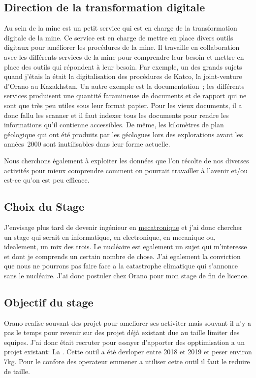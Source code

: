 \subsection{Direction de la transformation digitale}
Au sein de la mine est un petit service qui est en charge de la transformation digitale de la mine. Ce service est en charge de mettre en place divers outils digitaux pour améliorer les procédures de la mine. Il travaille en collaboration avec les différents services de la mine pour comprendre leur besoin et mettre en place des outils qui répondent à leur besoin. Par exemple, un des grands sujets quand j'étais la était la digitalisation des procédures de Katco, la joint-venture d'Orano au Kazakhstan. Un autre exemple est la documentation~; les différents services produisent une quantité faramineuse de documents et de rapport qui ne sont que très peu utiles sous leur format papier. Pour les vieux documents, il a donc fallu les scanner et il faut indexer tous les documents pour rendre les informations qu'il contienne accessibles. De même, les kilomètres de plan géologique qui ont été produits par les géologues lors des explorations avant les années~2000 sont inutilisables dans leur forme actuelle.

Nous cherchons également à exploiter les données que l'on récolte de nos diverses activités pour mieux comprendre comment on pourrait travailler à l'avenir et/ou est-ce qu’on est peu efficace.

\subsection{Choix du Stage}
J'envisage plus tard de devenir ingénieur en \href{https://fr.wikipedia.org/wiki/M%C3%A9catronique}{mecatronique} et j'ai donc chercher un stage qui serait en informatique, en electronique, en mecanique ou, idealement, un mix des trois. Le nucléaire est egalement un sujet qui m'interesse et dont je comprends un certain nombre de chose. J'ai egalement la conviction que nous ne pourrons pas faire face a la catastrophe climatique qui s'annonce sans le nucléaire. J'ai donc postuler chez Orano pour mon stage de fin de licence. 
\subsection{Objectif du stage}

Orano realise souvant des projet pour ameliorer ses activiter mais souvant il n'y a pas le temps pour revenir sur des projet déjà existant due au taille limiter des equipes. J'ai donc était recruter pour essayer d'apporter des opptimisation a un projet existant: La . Cette outil a été devloper entre 2018 et 2019 et peser environ 7kg. Pour le confore des operateur emmener a utiliser cette outil il faut le reduire de taille.